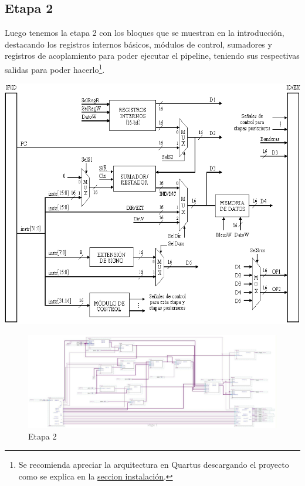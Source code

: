 \documentclass{IEEEtran}
\begin{document}
\subsection{Etapa 2}
\label{sec:org6205604}
Luego tenemos la etapa 2 con los bloques que se muestran en la introducción, destacando los registros internos básicos, módulos de control, sumadores y registros de acoplamiento para
poder ejecutar el pipeline, teniendo sus respectivas salidas para poder hacerlo\footnote{Se recomienda apreciar la arquitectura en Quartus descargando el proyecto como se explica en la \hyperref[sec:instalacion]{seccion instalación}.}.
\begin{center}
\includegraphics[width=\linewidth]{./img/e2s.png}
\end{center}
\begin{figure}[htbp]
\centering
\includegraphics[width=.9\linewidth]{./img/e2.png}
\caption{Etapa 2}
\end{figure}
\end{document}
